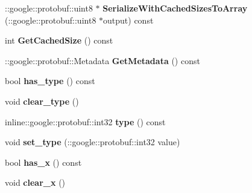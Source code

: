 \begin{DoxyCompactItemize}
\item 
\hypertarget{class_game_object_notify_ab5cc1ecedbad464ce4c41eecb433578a}{\-::google\-::protobuf\-::uint8 $\ast$ {\bfseries Serialize\-With\-Cached\-Sizes\-To\-Array} (\-::google\-::protobuf\-::uint8 $\ast$output) const }\label{class_game_object_notify_ab5cc1ecedbad464ce4c41eecb433578a}

\item 
\hypertarget{class_game_object_notify_a5acae24a360fd54d2d7205008062ecc5}{int {\bfseries Get\-Cached\-Size} () const }\label{class_game_object_notify_a5acae24a360fd54d2d7205008062ecc5}

\item 
\hypertarget{class_game_object_notify_acd92d4fc01971fb1ee172cf5a31e62e0}{\-::google\-::protobuf\-::\-Metadata {\bfseries Get\-Metadata} () const }\label{class_game_object_notify_acd92d4fc01971fb1ee172cf5a31e62e0}

\item 
\hypertarget{class_game_object_notify_a986b979c2aa32d4e32c252b669a9b77f}{bool {\bfseries has\-\_\-type} () const }\label{class_game_object_notify_a986b979c2aa32d4e32c252b669a9b77f}

\item 
\hypertarget{class_game_object_notify_af14051d1680998ba235723a1ce0fd2b6}{void {\bfseries clear\-\_\-type} ()}\label{class_game_object_notify_af14051d1680998ba235723a1ce0fd2b6}

\item 
\hypertarget{class_game_object_notify_ae8d17de08521388d76f137110050bf13}{inline\-::google\-::protobuf\-::int32 {\bfseries type} () const }\label{class_game_object_notify_ae8d17de08521388d76f137110050bf13}

\item 
\hypertarget{class_game_object_notify_a7fe38481f8de7d9692856779d01b92db}{void {\bfseries set\-\_\-type} (\-::google\-::protobuf\-::int32 value)}\label{class_game_object_notify_a7fe38481f8de7d9692856779d01b92db}

\item 
\hypertarget{class_game_object_notify_a716aa746890feeaeddfdafc070416c56}{bool {\bfseries has\-\_\-x} () const }\label{class_game_object_notify_a716aa746890feeaeddfdafc070416c56}

\item 
\hypertarget{class_game_object_notify_a64d8f47b2e78c603f6d0133480a869ec}{void {\bfseries clear\-\_\-x} ()}\label{class_game_object_notify_a64d8f47b2e78c603f6d0133480a869ec}


\end{DoxyCompactItemize}
